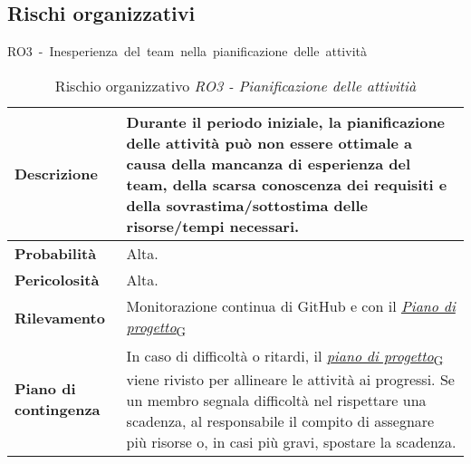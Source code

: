
\begin{table}[!h]
    \subsection{Rischi organizzativi}
    \centering
    \hbox{RO3 - Inesperienza del team nella pianificazione delle attività}
    \vspace{0.3cm}
	\begin{tabular}{|l|p{10cm}|} 
		\hline
		\textbf{Descrizione} & Durante il periodo iniziale, la pianificazione delle attività può non essere ottimale a causa della mancanza di esperienza del team, della scarsa conoscenza dei requisiti e della sovrastima/sottostima delle risorse/tempi necessari. \\ 
        \hline
        \textbf{Probabilità} & Alta. \\
        \hline
        \textbf{Pericolosità} & Alta. \\
        \hline
        \textbf{Rilevamento} & Monitorazione continua di GitHub e con il \href{https://7last.github.io/docs/rtb/documentazione-interna/glossario\#piano-di-progetto}{\textit{Piano di progetto}\textsubscript{G}} \\
        \hline
        \textbf{Piano di contingenza} & In caso di difficoltà o ritardi, il \href{https://7last.github.io/docs/rtb/documentazione-interna/glossario\#piano-di-progetto}{\textit{piano di progetto}\textsubscript{G}} viene rivisto per allineare le attività ai progressi. Se un membro segnala difficoltà nel rispettare una scadenza, al responsabile il compito di assegnare più risorse o, in casi più gravi, spostare la scadenza.\\
		\hline
	\end{tabular}
    \caption{Rischio organizzativo \textit{RO3 - Pianificazione delle attivitià}}
    \label{table:1}
\end{table}

